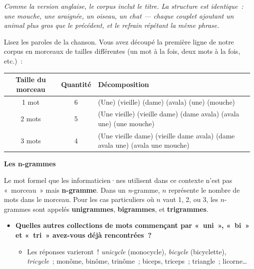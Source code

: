 \documentclass[12pt,a4paper]{article}
\begin{document}
\begin{keypointbox}
  \vspace{0.5em}
  \emph{Comme la version anglaise, le corpus inclut le titre. La structure est identique~: une mouche, une araignée, un oiseau, un chat — chaque couplet ajoutant un animal plus gros que le précédent, et le refrain répétant la même phrase.}
\end{keypointbox}

\begin{activitybox}
  Lisez les paroles de la chanson. Vous avez découpé la première ligne de notre corpus en morceaux de tailles différentes (un mot à la fois, deux mots à la fois, etc.)~:

  \begin{center}
  \begin{tabularx}{\textwidth}{c c X}
    \toprule
    \textbf{Taille du morceau} & \textbf{Quantité} & \textbf{Décomposition} \\
    \midrule
    1 mot  & 6 & (Une) (vieille) (dame) (avala) (une) (mouche) \\
    2 mots & 5 & (Une vieille) (vieille dame) (dame avala) (avala une) (une mouche) \\
    3 mots & 4 & (Une vieille dame) (vieille dame avala) (dame avala une) (avala une mouche) \\
    \bottomrule
  \end{tabularx}
  \end{center}
\end{activitybox}

\begin{keypointbox}
  \textbf{Les n-grammes}

  Le mot formel que les informaticien·nes utilisent dans ce contexte n'est pas «~morceau~» mais \textbf{n-gramme}. Dans un \emph{n}-gramme, $n$ représente le nombre de mots dans le morceau. Pour les cas particuliers où $n$ vaut 1, 2, ou 3, les $n$-grammes sont appelés \textbf{unigrammes}, \textbf{bigrammes}, et \textbf{trigrammes}.
\end{keypointbox}

\begin{thinkbox}
  \begin{itemize}
    \item \textbf{Quelles autres collections de mots commençant par «~uni~», «~bi~» et «~tri~» avez-vous déjà rencontrées~?}
    \begin{itemize}
      \item Les réponses varieront~! \emph{unicycle} (monocycle), \emph{bicycle} (bicyclette), \emph{tricycle}~; monôme, binôme, trinôme~; biceps, triceps~; triangle~; licorne…
    \end{itemize}
  \end{itemize}
\end{thinkbox}
\end{document}

